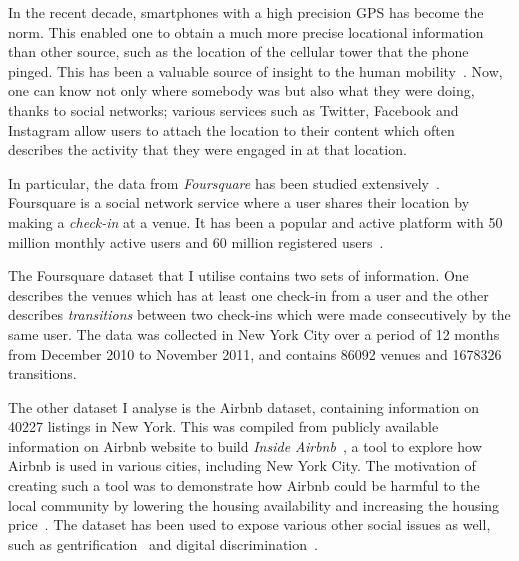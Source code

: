 In the recent decade, smartphones with a high precision GPS has become the norm. This enabled one to obtain a much more precise locational information than other source, such as the location of the cellular tower that the phone pinged. This has been a valuable source of insight to the human mobility~\citep{rhee2011levy, vazquez2013using, jiang2009characterizing}.
Now, one can know not only where somebody was but also what they were doing, thanks to social networks; various services such as Twitter, Facebook and Instagram allow users to attach the location to their content which often describes the activity that they were engaged in at that location. 

In particular, the data from \emph{Foursquare} has been studied extensively~\citep{scellato2011socio, noulas2011empirical, noulas2013exploiting}. Foursquare is a social network service where a user shares their location by making a \emph{check-in} at a venue. It has been a popular and active platform with 50 million monthly active users and 60 million registered users~\citep{50million}.

The Foursquare dataset that I utilise contains two sets of information. One describes the venues which has at least one check-in from a user and the other describes \emph{transitions} between two check-ins which were made consecutively by the same user. The data was collected in New York City over a period of 12 months from December 2010 to November 2011, and contains 86092 venues and 1678326 transitions. 


The other dataset I analyse is the Airbnb dataset, containing information on 40227 listings in New York. This was compiled from publicly available information on Airbnb website to build \emph{Inside Airbnb}~\citep{insideairbnb}, a tool to explore how Airbnb is used in various cities, including New York City.
The motivation of creating such a tool was to demonstrate how Airbnb could be harmful to the local community by lowering the housing availability and increasing the housing price~\citep{insideairbnb}.
The dataset has been used to expose various other social issues as well, such as gentrification~\citep{gentrification} and digital discrimination~\citep{edelman2014digital}.

